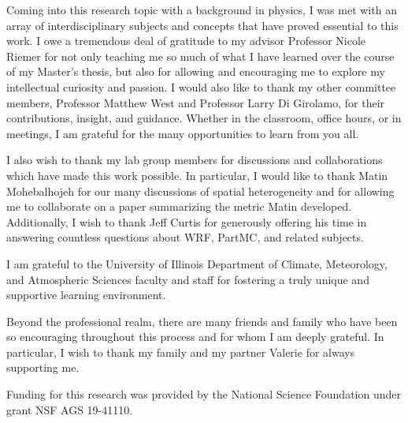 \begin{acknowledgments}

Coming into this research topic with a background in physics, I was met with an array of interdisciplinary subjects and concepts that have proved essential to this work. I owe a tremendous deal of gratitude to my advisor Professor Nicole Riemer for not only teaching me so much of what I have learned over the course of my Master's thesis, but also for allowing and encouraging me to explore my intellectual curiosity and passion. I would also like to thank my other committee members, Professor Matthew West and Professor Larry Di Girolamo, for their contributions, insight, and guidance. Whether in the classroom, office hours, or in meetings, I am grateful for the many opportunities to learn from you all. 

I also wish to thank my lab group members for discussions and collaborations which have made this work possible. In particular, I would like to thank Matin Mohebalhojeh for our many discussions of spatial heterogeneity and for allowing me to collaborate on a paper summarizing the metric Matin developed. Additionally, I wish to thank Jeff Curtis for generously offering his time in answering countless questions about WRF, PartMC, and related subjects. 

I am grateful to the University of Illinois Department of Climate, Meteorology, and Atmospheric Sciences faculty and staff for fostering a truly unique and supportive learning environment. 

Beyond the professional realm, there are many friends and family who have been so encouraging throughout this process and for whom I am deeply grateful. In particular, I wish to thank my family and my partner Valerie for always supporting me.  

Funding for this research was provided by the National Science Foundation under grant NSF AGS 19-41110. 

\end{acknowledgments}